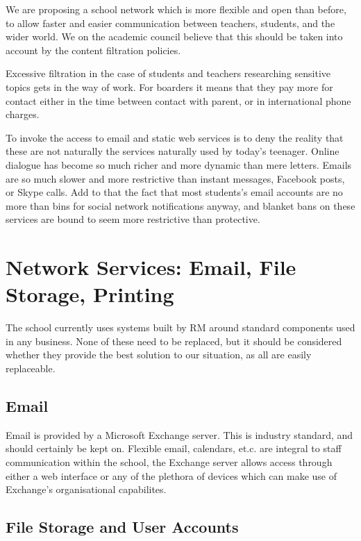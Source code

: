\documentclass[a4paper,leqno,titlepage]{article}
\begin{document}
We are proposing a school network which is more flexible and open than before,
to allow faster and easier communication between teachers, students, and the
wider world. We on the academic council believe that this should be taken into
account by the content filtration policies.


Excessive filtration in the case of students and teachers researching sensitive
topics gets in the way of work. For boarders it means that they pay more for
contact either in the time between contact with parent, or in international
phone charges.


To invoke the access to email and static web services is to deny the reality
that these are not naturally the services naturally used by today's teenager.
Online dialogue has become so much richer and more dynamic than mere letters.
Emails are so much slower and more restrictive than instant messages, Facebook
posts, or Skype calls. Add to that the fact that most students's email accounts
are no more than bins for social network notifications anyway, and blanket
bans on these services are bound to seem more restrictive than protective.






\section{Network Services: Email, File Storage, Printing}


The school currently uses systems built by RM around standard components used
in any business. None of these need to be replaced, but it should be
considered whether they provide the best solution to our situation, as all are
easily replaceable.


\subsection{Email}

Email is provided by a Microsoft Exchange server. This is industry standard, and
should certainly be kept on. Flexible email, calendars, et.c. are integral
to staff communication within the school, the Exchange server allows access
through either a web interface or any of the plethora of devices which
can make use of Exchange's organisational capabilites.


\subsection{File Storage and User Accounts}
\end{document}
